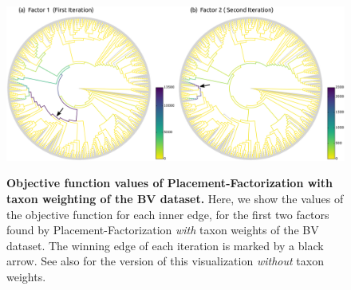 \begin{figure}[btp!]
    \centering
    \includegraphics[width=\linewidth]{pdf/pf_bv_place_tw_ovs.pdf}
    \begin{subfigure}{0pt}
        \label{fig:pf_bv_place_tw_ovs:sub:first}
    \end{subfigure}
    \begin{subfigure}{0pt}
        \label{fig:pf_bv_place_tw_ovs:sub:second}
    \end{subfigure}
    \caption[Objective function values of Placement-Factorization with taxon weighting of the \acs{BV} dataset]{
        \textbf{Objective function values of Placement-Factorization with taxon weighting of the \ac{BV} dataset.}
        Here, we show the values of the objective function for each inner edge,
        for the first two factors found by Placement-Factorization \emph{with} taxon weights of the \ac{BV} dataset.
        The winning edge of each iteration is marked by a black arrow.
        See also  for the version of this visualization \emph{without} taxon weights.
    }
    \label{fig:pf_bv_place_tw_ovs}
\end{figure}

